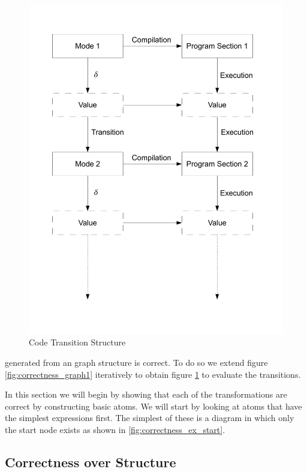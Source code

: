 \begin{figure}[htb]
    \centering
    \includegraphics[trim= 10mm 30mm 10mm 10mm, clip, width=\imgmedium]{./images/correctness_graph2.pdf}
    \caption{Code Transition Structure}
    \label{fig:correctness_graph2}
\end{figure}

generated from an graph structure is correct. To do so we extend figure \ref{fig:correctness_graph1} iteratively to obtain figure \ref{fig:correctness_graph2} to evaluate the transitions.

In this section we will begin by showing that each of the transformations are correct by constructing basic atoms. We will start by looking at atoms that have the simplest expressions first. The simplest of these is a diagram in which only the start node exists as shown in \ref{fig:correctness_ex_start}.

\subsection{Correctness over Structure}
